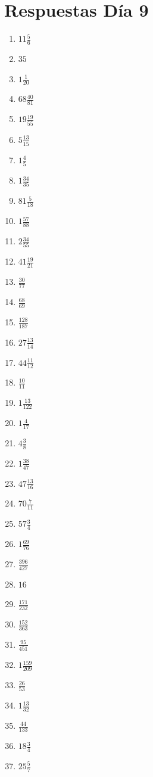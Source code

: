 \documentclass[12pt]{article}
\begin{document}
\section*{Respuestas Día 9}
\begin{enumerate}
\item $ 11 \frac{5}{6} $
\item $ 35 $
\item $ 1 \frac{1}{20} $
\item $ 68 \frac{40}{81} $
\item $ 19 \frac{19}{55} $
\item $ 5 \frac{13}{15} $
\item $ 1 \frac{4}{5} $
\item $ 1 \frac{34}{35} $
\item $ 81 \frac{5}{18} $
\item $ 1 \frac{57}{88} $
\item $ 2 \frac{34}{55} $
\item $ 41 \frac{19}{21} $
\item $ \frac{30}{77} $
\item $ \frac{68}{69} $
\item $ \frac{128}{187} $
\item $ 27 \frac{13}{14} $
\item $ 44 \frac{11}{12} $
\item $ \frac{10}{11} $
\item $ 1 \frac{13}{122} $
\item $ 1 \frac{4}{17} $
\item $ 4 \frac{3}{8} $
\item $ 1 \frac{38}{47} $
\item $ 47 \frac{13}{16} $
\item $ 70 \frac{7}{11} $
\item $ 57 \frac{3}{4} $
\item $ 1 \frac{69}{76} $
\item $ \frac{396}{427} $
\item $ 16 $
\item $ \frac{171}{232} $
\item $ \frac{152}{363} $
\item $ \frac{95}{451} $
\item $ 1 \frac{159}{209} $
\item $ \frac{26}{53} $
\item $ 1 \frac{13}{32} $
\item $ \frac{44}{133} $
\item $ 18 \frac{3}{4} $
\item $ 25 \frac{5}{7} $

\end{enumerate}
\end{document}
